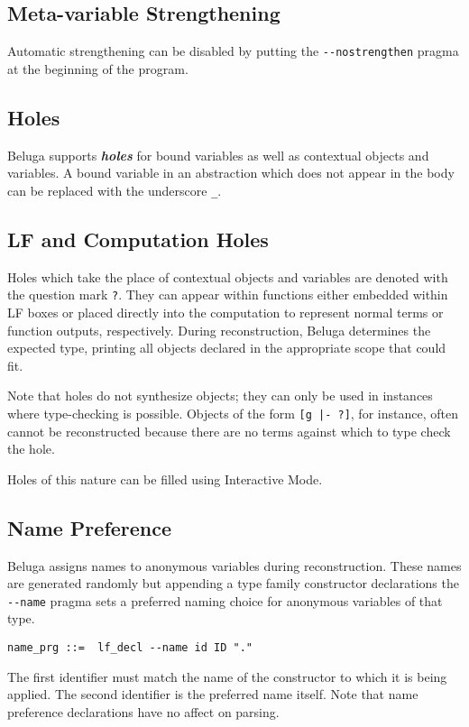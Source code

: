 \documentclass[11pt]{article}
\begin{document}
\subsection{Meta-variable Strengthening}
Automatic strengthening can be disabled by putting the \texttt{-{}-nostrengthen} pragma at the beginning of the program.

\subsection{Holes}
Beluga supports \textit{\textbf{holes}} for bound variables as well as contextual objects and variables. A bound variable in an abstraction which does not appear in the body can be replaced with the underscore \texttt{\_}.

\subsection{LF and Computation Holes}
Holes which take the place of contextual objects and variables are denoted with the question mark \texttt{?}. They can appear within functions either embedded within LF boxes or placed directly into the computation to represent normal terms or function outputs, respectively. During reconstruction, Beluga determines the expected type, printing all objects declared in the appropriate scope that could fit.

Note that holes do not synthesize objects; they can only be used in instances where type-checking is possible. Objects of the form \texttt{[g |- ?]}, for instance, often cannot be reconstructed because there are no terms against which to type check the hole.

Holes of this nature can be filled using Interactive Mode.

\subsection{Name Preference}
Beluga assigns names to anonymous variables during reconstruction. These names are generated randomly but appending a type family constructor declarations the \texttt{-{}-name} pragma sets a preferred naming choice for anonymous variables of that type. 
\begin{verbatim}
name_prg ::=  lf_decl --name id ID "."    
\end{verbatim}
The first identifier must match the name of the constructor to which it is being applied. The second identifier is the preferred name itself. Note that name preference declarations have no affect on parsing. 
\end{document}
